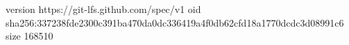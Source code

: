 version https://git-lfs.github.com/spec/v1
oid sha256:337238fde2300c391ba470da0dc336419a4f0db62cfd18a1770dcdc3d08991c6
size 168510
